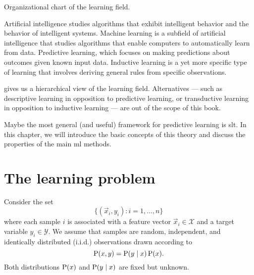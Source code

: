 \begin{figurebox}[label=fig:learning]{Organizational chart of the learning field.}
  \centering
  \tcblower
  Artificial intelligence studies algorithms that exhibit intelligent behavior and the
  behavior of intelligent systems.  Machine learning is a subfield of artificial
  intelligence that studies algorithms that enable computers to automatically learn from
  data.  Predictive learning, which focuses on making predictions about outcomes given
  known input data.  Inductive learning is a yet more specific type of learning that
  involves deriving general rules from specific observations.
\end{figurebox}

 gives us a hierarchical view of the learning field.  Alternatives ---
such as descriptive learning in opposition to predictive learning, or transductive
learning in opposition to inductive learning --- are out of the scope of this book.

Maybe the most general (and useful) framework for predictive learning is \gls{slt}.
In this chapter, we will introduce the basic concepts of this theory and discuss the
properties of the main \gls{ml} methods.

\section{The learning problem}
\label{sec:learning-problem}

Consider the set
\begin{equation}
  \label{eq:training-set}
  \big\{(\vec{x}_i, y_i) : i = 1, \dots, n \big\}
\end{equation}
where each sample $i$ is associated with a feature vector $\vec{x}_i \in \mathcal{X}$ and a target variable
$y_i \in \mathcal{Y}$.  We assume that samples are random, independent, and identically
distributed (i.i.d.) observations drawn according to $$\operatorname{P}(x, y) = \operatorname{P}(y \mid x) \operatorname{P}(x)\text{.}$$
Both distributions $\operatorname{P}(x)$ and $\operatorname{P}(y \mid x)$ are fixed but unknown.

